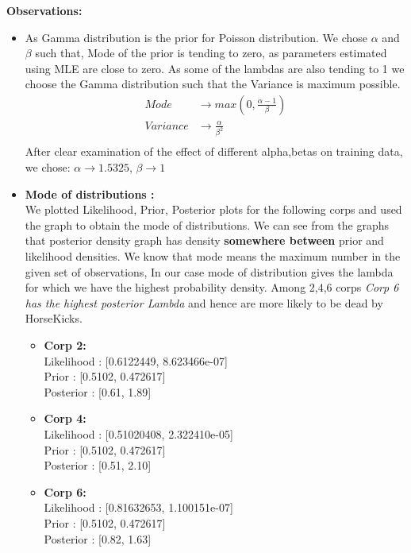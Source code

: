 \documentclass[english,a4paper,12pt]{article}
\begin{document}
\begin{enumerate}
\textbullet\textbf{Observations:}
    \begin{itemize}
        \item As Gamma distribution is the prior for Poisson distribution. We chose $\alpha$ and $\beta$ such that, Mode of the prior is tending to zero, as parameters estimated using MLE are close to zero. As some of the lambdas are also tending to 1 we choose the Gamma distribution such that the Variance is maximum possible.
      \begin{equation} \label{eq1}
\begin{split}
Mode &\rightarrow   max(0,\frac{\alpha -1}{\beta }) \\
Variance &\rightarrow \frac{\alpha}{\beta ^ 2}\\
\end{split}
\end{equation}
After clear examination of the effect of different alpha,betas on training data,\\we chose:
$\alpha \rightarrow 1.5325$,
$\beta \rightarrow 1$
\vspace{2cm}
\item \textbf{Mode of distributions :}\\
We plotted Likelihood, Prior, Posterior plots for the following corps and used the graph to obtain the mode of distributions. We can see from the graphs that posterior density graph has density \textbf{somewhere between} prior and likelihood densities.
We know that mode means the maximum number in the given set of observations, In our case mode of distribution gives the lambda for which we have the highest probability density. Among 2,4,6 corps \textit{Corp 6 has the highest posterior Lambda} and hence are more likely to be dead by HorseKicks.
    \begin{itemize}
        \item \textbf{Corp 2:}\\
    Likelihood : [0.6122449, 8.623466e-07]\\
    Prior : [0.5102, 0.472617] \\
    Posterior : [0.61, 1.89]
    \item \textbf{Corp 4:}\\
    Likelihood : [0.51020408, 2.322410e-05]\\
    Prior : [0.5102, 0.472617]\\
    Posterior : [0.51, 2.10]
    \item \textbf{Corp 6:}\\
    Likelihood : [0.81632653, 1.100151e-07]\\
    Prior : [0.5102, 0.472617]\\
    Posterior : [0.82, 1.63]
    \end{itemize}
    \end{itemize}
    

\end{enumerate}
\end{document}
